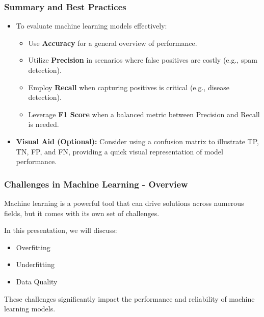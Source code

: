 \documentclass[aspectratio=169]{beamer}
\begin{document}
\begin{frame}[fragile]
    \frametitle{Summary and Best Practices}
    \begin{itemize}
        \item To evaluate machine learning models effectively:
        \begin{itemize}
            \item Use \textbf{Accuracy} for a general overview of performance.
            \item Utilize \textbf{Precision} in scenarios where false positives are costly (e.g., spam detection).
            \item Employ \textbf{Recall} when capturing positives is critical (e.g., disease detection).
            \item Leverage \textbf{F1 Score} when a balanced metric between Precision and Recall is needed.
        \end{itemize}
        \item \textbf{Visual Aid (Optional):} Consider using a confusion matrix to illustrate TP, TN, FP, and FN, providing a quick visual representation of model performance.
    \end{itemize}
\end{frame}

\begin{frame}[fragile]
    \frametitle{Challenges in Machine Learning - Overview}
    Machine learning is a powerful tool that can drive solutions across numerous fields, but it comes with its own set of challenges.
    
    In this presentation, we will discuss:
    \begin{itemize}
        \item Overfitting
        \item Underfitting
        \item Data Quality
    \end{itemize}
    
    These challenges significantly impact the performance and reliability of machine learning models.
\end{frame}
\end{document}
